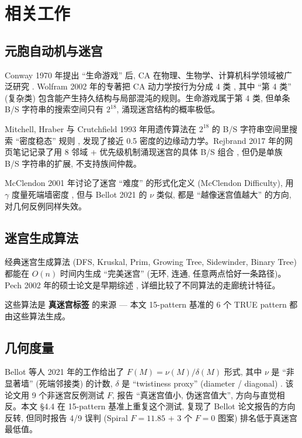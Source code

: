 
\section{相关工作}
\label{sec:related}

\subsection{元胞自动机与迷宫}

Conway 1970 年提出 ``生命游戏'' 后, CA 在物理、生物学、计算机科学领域被广泛研究 \cite{conway1970}. Wolfram 2002 年的专著把 CA 动力学按行为分成 4 类 \cite{wolfram2002}, 其中 ``第 4 类'' (复杂类) 包含能产生持久结构与局部混沌的规则。生命游戏属于第 4 类, 但单条 B/S 字符串的搜索空间只有 $2^{18}$, 涌现迷宫结构的概率极低。

Mitchell, Hraber 与 Crutchfield 1993 年用遗传算法在 $2^{18}$ 的 B/S 字符串空间里搜索 ``密度稳态'' 规则 \cite{mitchell1993}, 发现了接近 0.5 密度的边缘动力学。Rejbrand 2017 年的网页笔记记录了用 8 邻域 + 优先级机制涌现迷宫的具体 B/S 组合 \cite{rejbrand2017}, 但仍是单族 B/S 字符串的扩展, 不支持族间仲裁。

McClendon 2001 年讨论了迷宫 ``难度'' 的形式化定义 (McClendon Difficulty), 用 $\gamma$ 度量死端墙密度 \cite{mcclendon2001}, 但与 Bellot 2021 的 $\nu$ 类似, 都是 ``越像迷宫值越大'' 的方向, 对几何反例同样失效。

\subsection{迷宫生成算法}

经典迷宫生成算法 (DFS, Kruskal, Prim, Growing Tree, Sidewinder, Binary Tree) 都能在 $O(n)$ 时间内生成 ``完美迷宫'' (无环, 连通, 任意两点恰好一条路径)。Pech 2002 年的硕士论文是早期综述 \cite{pech2002}, 详细比较了不同算法的走廊统计特征。

这些算法是 \textbf{真迷宫标签} 的来源 --- 本文 15-pattern 基准的 6 个 TRUE pattern 都由这些算法生成。

\subsection{几何度量}

Bellot 等人 2021 年的工作给出了 $F(M) = \nu(M) / \delta(M)$ 形式, 其中 $\nu$ 是 ``非显著墙'' (死端邻接类) 的计数, $\delta$ 是 ``twistiness proxy'' (diameter / diagonal) \cite{bellot2021}. 该论文用 9 个非迷宫反例测试 $F$, 报告 ``真迷宫值小, 伪迷宫值大'', 方向与直觉相反。本文 §4.4 在 15-pattern 基准上重复这个测试, 复现了 Bellot 论文报告的方向反转, 但同时报告 4/9 误判 (Spiral $F{=}11.85$ + 3 个 $F{=}0$ 图案) 排名低于真迷宫最低值。

